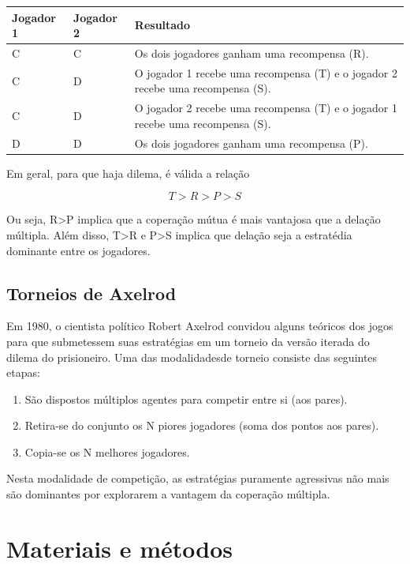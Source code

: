 \documentclass[a4paper]{article}
\begin{document}
			\begin{center}
				\begin{tabular}{| l | l | p{5cm} |}
					\hline
					Jogador 1 & Jogador 2 & Resultado \\ \hline
					C & C & Os dois jogadores ganham uma recompensa (R). \\ \hline
					C & D & O jogador 1 recebe uma recompensa (T) e o jogador 2 recebe uma recompensa (S). \\ \hline
					C & D & O jogador 2 recebe uma recompensa (T) e o jogador 1 recebe uma recompensa (S). \\ \hline
					D & D & Os dois jogadores ganham uma recompensa (P). \\ \hline
				\end{tabular}
			\end{center}

			Em geral, para que haja dilema, é válida a relação

			$$
				T>R>P>S
			$$

			Ou seja, R>P implica que a coperação mútua é mais vantajosa que a delação múltipla. Além disso, T>R e P>S implica que delação seja a estratédia dominante entre os jogadores.

		\subsection{Torneios de Axelrod}
			Em 1980, o cientista político Robert Axelrod convidou alguns teóricos dos jogos para que submetessem suas estratégias em um torneio da versão iterada do dilema do prisioneiro.
			Uma das modalidadesde torneio consiste das seguintes etapas:

			\begin{enumerate}  
				\item São dispostos múltiplos agentes para competir entre si (aos pares).
				\item Retira-se do conjunto os N piores jogadores (soma dos pontos aos pares).
				\item Copia-se os N melhores jogadores.
			\end{enumerate}

			Nesta modalidade de competição, as estratégias puramente agressivas não mais são dominantes por explorarem a vantagem da coperação múltipla.

	\section{Materiais e métodos}
\end{document}
